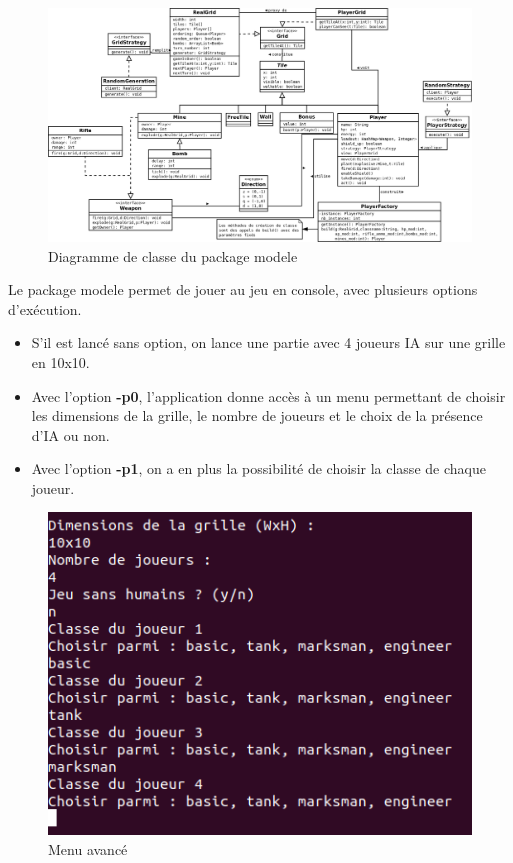 \documentclass[a4paper,12pt]{article} %
\begin{document}
\begin{figure}[!h]
\centering
\includegraphics[scale=0.33]{images/modele.png}
\caption{Diagramme de classe du package modele}
\end{figure}

Le package modele permet de jouer au jeu en console, avec plusieurs options d'exécution.
\begin{itemize}
\item S'il est lancé sans option, on lance une partie avec 4 joueurs IA sur une grille en 10x10.
\item Avec l'option \textbf{-p0}, l'application donne accès à un menu permettant de choisir les dimensions de la grille, le nombre de joueurs et le choix de la présence d'IA ou non.
\item Avec l'option \textbf{-p1}, on a en plus la possibilité de choisir la classe de chaque joueur.
\end{itemize}


\begin{figure}[!h]
\centering
\includegraphics[scale=0.5]{images/menu.png}
\caption{Menu avancé}
\end{figure}
\end{document}
